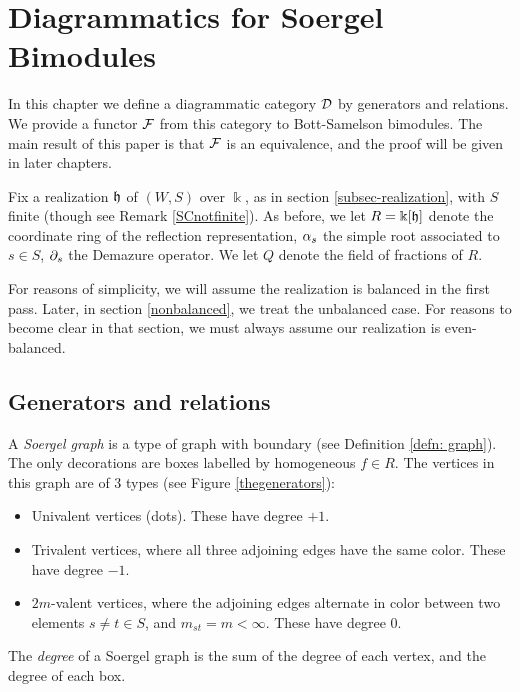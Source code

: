 

\section{Diagrammatics for Soergel Bimodules} \label{sec-diagsbim}

In this chapter we define a diagrammatic category ${\mathcal{D}}$ by generators and relations. We provide a functor ${\mathcal{F}}$ from this category to Bott-Samelson bimodules. The main result of this paper
is that ${\mathcal{F}}$ is an equivalence, and the proof will be given in later chapters.

Fix a realization ${\mathfrak h}$ of $(W,S)$ over $\Bbbk$, as in section \ref{subsec-realization}, with $S$ finite (though see Remark \ref{SCnotfinite}). As before, we let $R = \Bbbk[{\mathfrak h}]$ denote
the coordinate ring of the reflection representation, $\alpha_s$ the simple root associated to $s \in S$, $\partial_s$ the Demazure operator. We let $Q$ denote the field of fractions of $R$.

For reasons of simplicity, we will assume the realization is balanced in the first pass. Later, in section \ref{nonbalanced}, we treat the unbalanced case. For reasons to become clear in
that section, we must always assume our realization is even-balanced.

\subsection{Generators and relations}

\begin{defn} A \emph{Soergel graph} is a type of graph with boundary (see Definition \ref{defn: graph}). The only decorations are boxes labelled by homogeneous $f \in R$. The vertices in this graph are of 3 types (see Figure \ref{thegenerators}):

\begin{itemize} \item Univalent vertices (dots). These have degree $+1$. \item Trivalent vertices, where all three adjoining edges have the same color. These have degree $-1$. \item
$2m$-valent vertices, where the adjoining edges alternate in color between two elements $s \ne t \in S$, and $m_{st}=m<\infty$. These have degree $0$. \end{itemize}

The \emph{degree} of a Soergel graph is the sum of the degree of each vertex, and the degree of each box. \end{defn}

